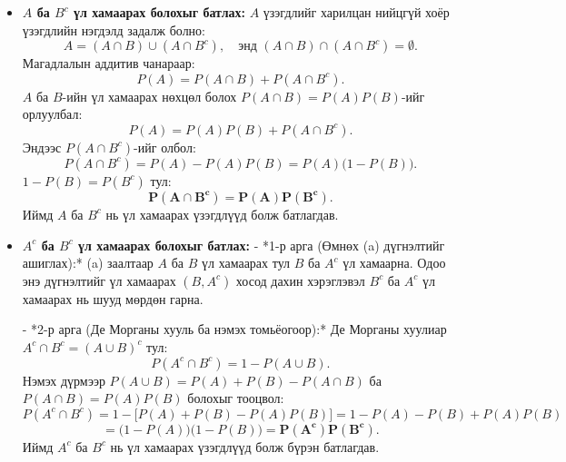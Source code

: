 \documentclass[11pt,a4paper]{article}
\begin{document}
\begin{itemize}[leftmargin=1.4em, itemsep=3pt]
  \item[\textbf{(a)}] 				\textbf{$A$ ба $B^c$ үл хамаарах болохыг батлах:}
    $A$ үзэгдлийг харилцан нийцгүй хоёр үзэгдлийн нэгдэлд задалж болно:
    \[
      A = (A \cap B) \cup (A \cap B^c), \quad \text{энд } (A \cap B) \cap (A \cap B^c) = \emptyset.
    \]
    Магадлалын аддитив чанараар:
    \[
      P(A) = P(A \cap B) + P(A \cap B^c).
    \]
    $A$ ба $B$-ийн үл хамаарах нөхцөл болох $P(A \cap B) = P(A)P(B)$-ийг орлуулбал:
    \[
      P(A) = P(A)P(B) + P(A \cap B^c).
    \]
    Эндээс $P(A \cap B^c)$-ийг олбол:
    \[
      P(A \cap B^c) = P(A) - P(A)P(B) = P(A)\big(1 - P(B)\big).
    \]
    $1 - P(B) = P(B^c)$ тул:
    \[
      \mathbf{P(A \cap B^c) = P(A)P(B^c)}.
    \]
    Иймд $A$ ба $B^c$ нь үл хамаарах үзэгдлүүд болж батлагдав.

  \item[\textbf{(б)}] 				\textbf{$A^c$ ба $B^c$ үл хамаарах болохыг батлах:}
    - *1-р арга (Өмнөх (a) дүгнэлтийг ашиглах):*
      (a) заалтаар $A$ ба $B$ үл хамаарах тул $B$ ба $A^c$ үл хамаарна.
      Одоо энэ дүгнэлтийг үл хамаарах $(B, A^c)$ хосод дахин хэрэглэвэл $B^c$ ба $A^c$ үл хамаарах нь шууд мөрдөн гарна.

    - *2-р арга (Де Морганы хууль ба нэмэх томьёогоор):*
      Де Морганы хуулиар $A^c \cap B^c = (A \cup B)^c$ тул:
      \[
        P(A^c \cap B^c) = 1 - P(A \cup B).
      \]
      Нэмэх дүрмээр $P(A \cup B) = P(A) + P(B) - P(A \cap B)$ ба $P(A \cap B) = P(A)P(B)$ болохыг тооцвол:
      \[
        P(A^c \cap B^c) = 1 - \big[P(A) + P(B) - P(A)P(B)\big] = 1 - P(A) - P(B) + P(A)P(B)
      \]
      \[
        = \big(1 - P(A)\big)\big(1 - P(B)\big) = \mathbf{P(A^c)P(B^c)}.
      \]
    Иймд $A^c$ ба $B^c$ нь үл хамаарах үзэгдлүүд болж бүрэн батлагдав.
\end{itemize}
\end{document}

